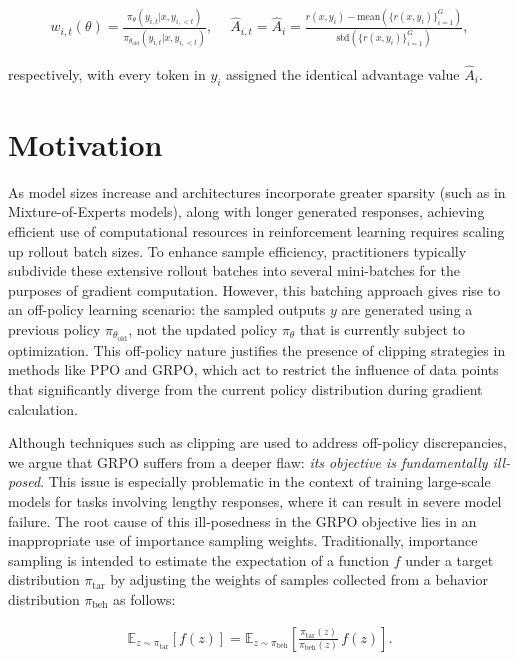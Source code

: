 \begin{align}
    w_{i,t}(\theta)=\frac{ \pi_{\theta} (y_{i,t} | x, y_{i,<t}) }{ \pi_{\theta_\text{old}} (y_{i,t} | x,y_{i,<t})},\quad\ 
    \widehat{A}_{i,t} = \widehat{A}_{i} = \frac{r(x, y_i) - \mathrm{mean} \left( \{ r(x, y_i) \}_{i=1}^G \right) }{ \mathrm{std} \left( \{ r(x, y_i) \}_{i=1}^G \right) },
\end{align}

respectively, with every token in $y_i$ assigned the identical advantage value $\widehat{A}_{i}$.

\section{Motivation}
\label{sec:motivation}

As model sizes increase and architectures incorporate greater sparsity (such as in Mixture-of-Experts models), along with longer generated responses, achieving efficient use of computational resources in reinforcement learning requires scaling up rollout batch sizes. To enhance sample efficiency, practitioners typically subdivide these extensive rollout batches into several mini-batches for the purposes of gradient computation. However, this batching approach gives rise to an off-policy learning scenario: the sampled outputs $y$ are generated using a previous policy $\pi_{\theta_\text{old}}$, not the updated policy $\pi_\theta$ that is currently subject to optimization. This off-policy nature justifies the presence of clipping strategies in methods like PPO and GRPO, which act to restrict the influence of data points that significantly diverge from the current policy distribution during gradient calculation.

Although techniques such as clipping are used to address off-policy discrepancies, we argue that GRPO suffers from a deeper flaw: \textit{its objective is fundamentally ill-posed}. This issue is especially problematic in the context of training large-scale models for tasks involving lengthy responses, where it can result in severe model failure. The root cause of this ill-posedness in the GRPO objective lies in an inappropriate use of importance sampling weights. Traditionally, importance sampling is intended to estimate the expectation of a function $f$ under a target distribution $\pi_\text{tar}$ by adjusting the weights of samples collected from a behavior distribution $\pi_\text{beh}$ as follows:

\begin{align}
\mathbb{E}_{z \sim \pi_\text{tar}} \left[ f(z) \right] = \mathbb{E}_{z \sim \pi_\text{beh}} \left[ \frac{ \pi_\text{tar} (z) }{ \pi_\text{beh} (z)} \, f(z) \right].
\end{align}

